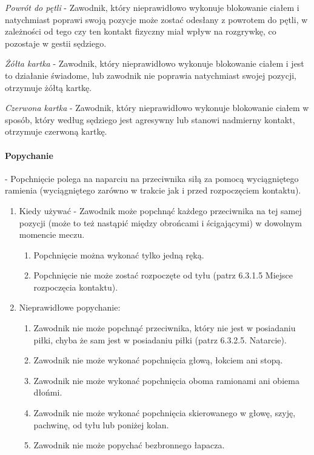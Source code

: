 \documentclass[12pt]{article}
\begin{document}
\emph{Powrót do pętli} - Zawodnik, który nieprawidłowo wykonuje
blokowanie ciałem i natychmiast poprawi swoją pozycje może zostać
odesłany z powrotem do pętli, w zależności od tego czy ten kontakt
fizyczny miał wpływ na rozgrywkę, co pozostaje w gestii sędziego.

\emph{Żółta kartka} - Zawodnik, który nieprawidłowo wykonuje blokowanie
ciałem i jest to działanie świadome, lub zawodnik nie poprawia
natychmiast swojej pozycji, otrzymuje żółtą kartkę.

\emph{Czerwona kartka} - Zawodnik, który nieprawidłowo wykonuje
blokowanie ciałem w sposób, który według sędziego jest agresywny lub
stanowi nadmierny kontakt, otrzymuje czerwoną kartkę.

\paragraph{Popychanie} - Popchnięcie polega na naparciu na
przeciwnika siłą za pomocą wyciągniętego ramienia (wyciągniętego zarówno
w trakcie jak i przed rozpoczęciem kontaktu).

\begin{enumerate}
	\item
	      Kiedy używać - Zawodnik może popchnąć każdego przeciwnika na tej samej
	      pozycji (może to też nastąpić między obrońcami i ścigającymi) w
	      dowolnym momencie meczu.

	      \begin{enumerate}
		      \item
		            Popchnięcie można wykonać tylko jedną ręką.
		      \item
		            Popchnięcie nie może zostać rozpoczęte od tyłu (patrz 6.3.1.5
		            Miejsce rozpoczęcia kontaktu).
	      \end{enumerate}
	\item
	      Nieprawidłowe popychanie:

	      \begin{enumerate}
		      \item
		            Zawodnik nie może popchnąć przeciwnika, który nie jest w posiadaniu
		            piłki, chyba że sam jest w posiadaniu piłki (patrz 6.3.2.5.
		            Natarcie).
		      \item
		            Zawodnik nie może wykonać popchnięcia głową, łokciem ani stopą.
		      \item
		            Zawodnik nie może wykonać popchnięcia oboma ramionami ani obiema
		            dłońmi.
		      \item
		            Zawodnik nie może wykonać popchnięcia skierowanego w głowę, szyję,
		            pachwinę, od tyłu lub poniżej kolan.
		      \item
		            Zawodnik nie może popychać bezbronnego łapacza.
	      \end{enumerate}
\end{enumerate}
\end{document}
